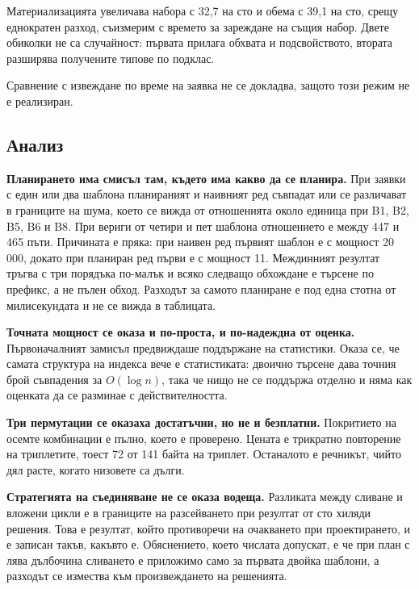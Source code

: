 Материализацията увеличава набора с 32{,}7 на сто и обема с 39{,}1 на сто, срещу еднократен
разход, съизмерим с времето за зареждане на същия набор. Двете обиколки не са случайност:
първата прилага обхвата и подсвойството, втората разширява получените типове по подклас.

Сравнение с извеждане по време на заявка не се докладва, защото този режим не е реализиран.

\subsection{Анализ}

\textbf{Планирането има смисъл там, където има какво да се планира.} При заявки с един или
два шаблона планираният и наивният ред съвпадат или се различават в границите на шума, което
се вижда от отношенията около единица при B1, B2, B5, B6 и B8. При вериги от четири и пет
шаблона отношението е между 447 и 465 пъти. Причината е пряка: при наивен ред първият шаблон
е  с мощност 20\,000, докато при планиран ред първи е
 с мощност 11. Междинният резултат тръгва с три порядъка
по-малък и всяко следващо обхождане е търсене по префикс, а не пълен обход. Разходът за
самото планиране е под една стотна от милисекундата и не се вижда в таблицата.

\textbf{Точната мощност се оказа и по-проста, и по-надеждна от оценка.} Първоначалният замисъл
предвиждаше поддържане на статистики. Оказа се, че самата структура на индекса вече е
статистиката: двоично търсене дава точния брой съвпадения за $O(\log n)$, така че нищо не се
поддържа отделно и няма как оценката да се разминае с действителността.

\textbf{Три пермутации се оказаха достатъчни, но не и безплатни.} Покритието на осемте
комбинации е пълно, което е проверено. Цената е трикратно повторение на триплетите, тоест
72 от 141 байта на триплет. Останалото е речникът, чийто дял расте, когато низовете са дълги.

\textbf{Стратегията на съединяване не се оказа водеща.} Разликата между сливане и вложени
цикли е в границите на разсейването при резултат от сто хиляди решения. Това е резултат,
който противоречи на очакването при проектирането, и е записан такъв, какъвто е. Обяснението,
което числата допускат, е че при план с лява дълбочина сливането е приложимо само за първата
двойка шаблони, а разходът се измества към произвеждането на решенията.

